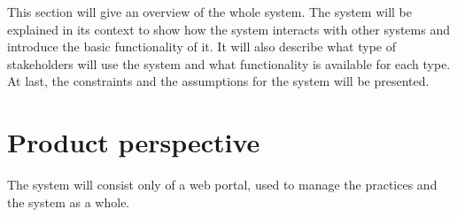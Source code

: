 \documentclass[../main.tex]{subfiles}
\begin{document}
	This section will give an overview of the whole system. The system will be explained in its context to show how the system interacts with other systems and introduce the basic functionality of it. It will also describe what type of stakeholders will use the system and what functionality  is available for each type. At last, the constraints and the assumptions for the system will be presented.
	\section{Product perspective}
	The system will consist only of a web portal, used to manage the practices and the system as a whole.
\end{document}
